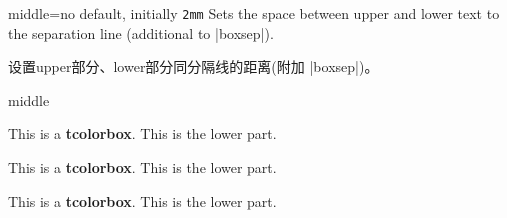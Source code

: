 \begin{docTcbKey}{middle}{=}{no default, initially \texttt{2mm}}
  Sets the space between upper and lower text to the separation line
  (additional to |boxsep|).

设置upper部分、lower部分同分隔线的距离(附加 |boxsep|)。
\begin{exdispExample}{middle}

\begin{tcolorbox}[middle=0mm,boxsep=0mm]
This is a \textbf{tcolorbox}.
\tcblower
This is the lower part.
\end{tcolorbox}
\begin{tcolorbox}[boxsep=0mm]
  This is a \textbf{tcolorbox}.
  \tcblower
  This is the lower part.
  \end{tcolorbox}
  \begin{tcolorbox}
    This is a \textbf{tcolorbox}.
    \tcblower
    This is the lower part.
    \end{tcolorbox}
\end{exdispExample}
\end{docTcbKey}


